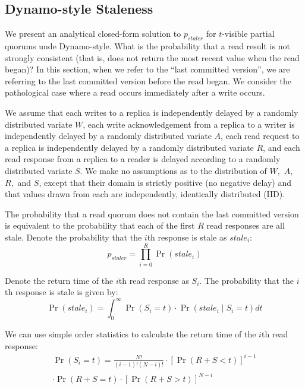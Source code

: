 \documentclass{vldb}
\begin{document}
\begin{appendix}
\section{Dynamo-style Staleness}

We present an analytical closed-form solution to $p_{staler}$ for
$t$-visible partial quorums unde Dynamo-style.  What is the
probability that a read result is not strongly consistent (that is,
does not return the most recent value when the read began)? In this
section, when we refer to the ``last committed version'', we are
referring to the last committed version before the read began. We
consider the pathological case where a read occurs immediately after a
write occurs.

We assume that each writes to a replica is independently delayed by a
randomly distributed variate $W$, each write acknowledgement from a
replica to a writer is independently delayed by a randomly distributed
variate $A$, each read request to a replica is independently delayed
by a randomly distributed variate $R$, and each read response from a
replica to a reader is delayed according to a randomly distributed
variate $S$.  We make no assumptions as to the distribution of $W,$
$A,$ $R,$ and $S$, except that their domain is strictly positive (no
negative delay) and that values drawn from each are independently,
identically distributed (IID).

The probability that a read quorum does not contain the last committed
version is equivalent to the probability that each of the first $R$
read responses are all stale.  Denote the probability that the $i$th
response is stale as $stale_i$:
\begin{equation*}
p_{staler} = \prod_{i=0}^{R} \Pr(stale_i)
\end{equation*}

Denote the return time of the $i$th read response as $S_i$.  The probability that the $i$th response is stale is given by:
\begin{equation*}
\Pr(stale_i) = \int_{0}^{\infty} \Pr(S_i = t) \cdot \Pr(stale_i \mid S_i = t) dt
\end{equation*}

We can use simple order statistics to calculate the return time of the $i$th read response:
\begin{multline*}
\Pr(S_i = t) = \frac{N!}{(i-1)!(N-i)!}\cdot[\Pr(R+S< t)]^{i-1}\\\cdot\Pr(R+S = t)\cdot[\Pr(R+S > t)]^{N-i}
\end{multline*}


\end{appendix}
\end{document}
